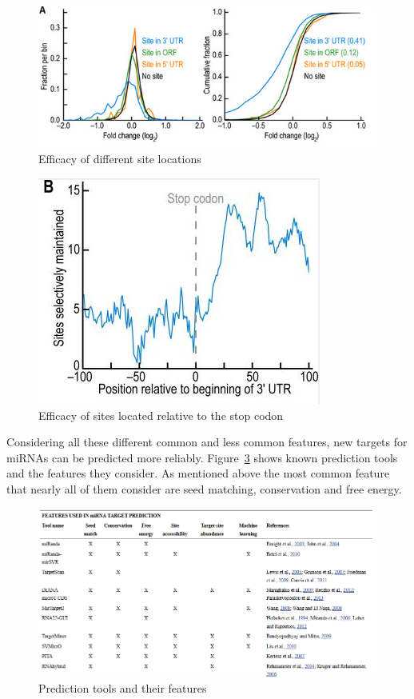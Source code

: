 \documentclass[12pt,  a4paper]{report}
\begin{document}
\begin{figure}
\centering
\includegraphics[scale=0.74]{results/sites_orf.PNG}
\caption{Efficacy of different site locations}
\label{siteorf}
\end{figure}

\begin{figure}
\centering
\includegraphics[scale=0.6]{results/site_stop.PNG} 
\caption{Efficacy of sites located relative to the stop codon}
\label{sitestop}
\end{figure}


   
Considering all these different common and less common features, new targets for miRNAs can be predicted more reliably. Figure~\ref{fig:tools} shows known prediction tools and the features they consider. As mentioned above the most common feature that nearly all of them consider are seed matching, conservation and free energy. \\


\begin{figure}
\centering
\includegraphics[scale=0.6]{results/tools.PNG}
\caption{Prediction tools and their features}
\label{fig:tools}
\end{figure}
\end{document}

